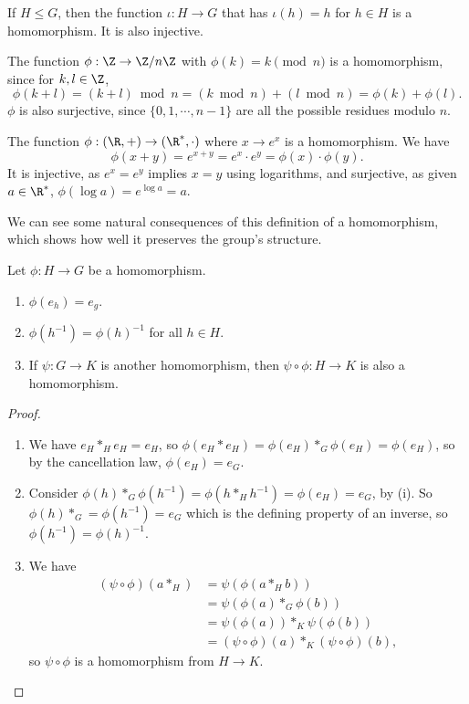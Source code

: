 \documentclass[a4paper]{scrartcl}
\begin{document}
\begin{example}
	If $H \leq G$, then the function $\iota : H \rightarrow G$ that has $\iota(h) = h$ for $h \in H$ is a homomorphism. It is also injective.
\end{example}

\begin{example}
	The function $\phi : \Z\rightarrow \Z/n\Z$ with $\phi(k) = k \pmod{n}$ is a homomorphism, since for $k, l \in \Z$,
	$$
\phi(k + l) = (k + l) \bmod{n} = (k \bmod{n}) + (l \bmod{n}) = \phi(k) + \phi(l).
	$$
	$\phi$ is also surjective, since $\{0, 1, \cdots, n - 1\}$ are all the possible residues modulo $n$.
\end{example}

\begin{example}
	The function $\phi : (\R, + )\rightarrow (\R^*, \cdot)$ where $x \rightarrow e^x$ is a homomorphism. We have
	$$
	\phi(x + y) = e^{x + y} = e^x \cdot e^y = \phi(x) \cdot \phi(y).
	$$
	It is injective, as $e^x = e^y$ implies $x = y$ using logarithms, and surjective, as given $a \in \R^*$, $\phi(\log a) = e^{\log a} = a$.
\end{example}

We can see some natural consequences of this definition of a homomorphism, which shows how well it preserves the group's structure.

\begin{proposition}
	Let $\phi : H \rightarrow G$ be a homomorphism.
	\begin{enumerate}[label=(\roman*)]
		\item $\phi(e_h) = e_g$. 
		\item $\phi(h^{-1}) = \phi(h)^{-1}$ for all $h \in H$.
		\item If $\psi : G \rightarrow K$ is another homomorphism, then $\psi \circ \phi : H \rightarrow K$ is also a homomorphism.
	\end{enumerate}
\end{proposition}
\begin{proof}
	$ $ \phantom{\qedhere}
	\begin{enumerate}[label=(\roman*)]
		\item We have $e_H *_H e_H = e_H$, so $\phi(e_H * e_H) = \phi(e_H) *_G \phi(e_H) = \phi(e_H)$, so by the cancellation law, $\phi(e_H) = e_G$.
		\item Consider $\phi(h) *_G \phi(h^{-1}) = \phi(h *_H h^{-1}) = \phi(e_H) = e_G$, by (i). So $\phi(h) *_G = \phi(h^{-1}) = e_G$ which is the defining property of an inverse, so $\phi(h^{-1}) = \phi(h)^{-1}$.
		\item We have 
		\begin{align*}
			(\psi \circ \phi)(a *_H) &= \psi(\phi(a *_H b))\\
									 &= \psi(\phi(a) *_G \phi(b))\\ 
									 &= \psi(\phi(a)) *_K \psi(\phi(b)) \\
									 &= (\psi \circ \phi)(a) *_K (\psi \circ \phi)(b),
		\end{align*}
		so $\psi \circ \phi$ is a homomorphism from $H \rightarrow K$.\hfill \qedsymbol
	\end{enumerate}
\end{proof}
\end{document}
